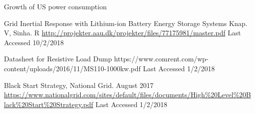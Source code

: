 \begin{thebibliography}{9}
Growth of US power consumption

Grid Inertial Response with Lithium-ion Battery Energy Storage Systems
Knap. V, Sinha. R
\url{http://projekter.aau.dk/projekter/files/77175981/master.pdf}
Last Accessed 10/2/2018

Datasheet for Resistive Load Dump
https://www.comrent.com/wp-content/uploads/2016/11/MS110-1000kw.pdf
Last Accessed 1/2/2018
                
Black Start Strategy, National Grid.
August 2017
\url{https://www.nationalgrid.com/sites/default/files/documents/High%20Level%20Black%20Start%20Strategy.pdf}
Last Accessed 1/2/2018

\end{thebibliography}

